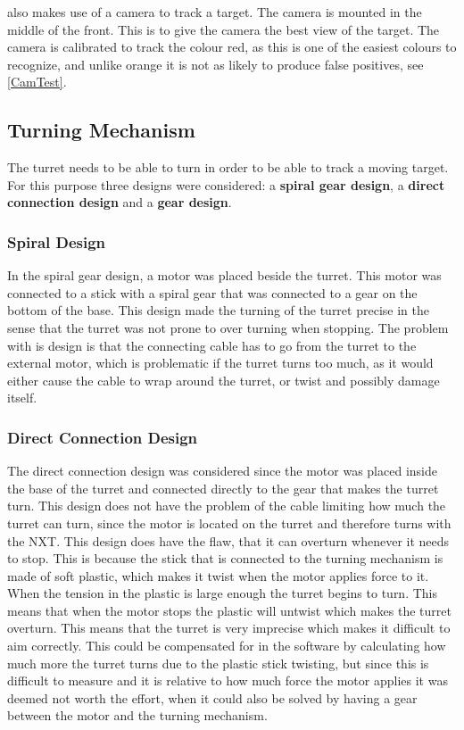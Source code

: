 \name also makes use of a camera to track a target. The camera is mounted in
the middle of the front. This is to give the camera the best view of the target.
The camera is calibrated to track the colour red, as this is one of the
easiest colours to recognize, and unlike orange it is not as likely to produce
false positives, see \autoref{CamTest}.

\subsection{Turning Mechanism}
The turret needs to be able to turn in order to be able to track a moving
target. For this purpose three designs were considered: a \textbf{spiral gear
design}, a \textbf{direct connection design} and a \textbf{gear design}.

\subsubsection{Spiral Design}
In the spiral gear design, a motor was placed beside the turret. This motor was
connected to a stick with a spiral gear that was connected to a gear on the
bottom of the base. This design made the turning of the turret precise in the
sense that the turret was not prone to over turning when stopping. The problem
with is design is that the connecting cable has to go from the turret to the
external motor, which is problematic if the turret turns too much, as it would
either cause the cable to wrap around the turret, or twist and possibly damage
itself.

\subsubsection{Direct Connection Design}
The direct connection design was considered since the motor was placed inside
the base of the turret and connected directly to the gear that makes the turret turn. This
design does not have the problem of the cable limiting how much the turret can
turn, since the motor is located on the turret and therefore turns with the
NXT. This design does have the flaw, that it can overturn whenever it needs
to stop. This is because the stick that is connected to the turning mechanism
is made of soft plastic, which makes it twist when the motor applies force to
it. When the tension in the plastic is large enough the turret begins to turn.
This means that when the motor stops the plastic will untwist which makes the
turret overturn. This means that the turret is very imprecise which makes it
difficult to aim correctly. This could be compensated for in the software by
calculating how much more the turret turns due to the plastic stick twisting,
but since this is difficult to measure and it is relative to how much force the motor applies it was deemed
not worth the effort, when it could also be solved by having a gear between
the motor and the turning mechanism.

